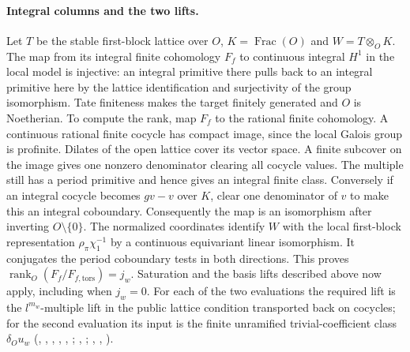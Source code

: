 \paragraph{Integral columns and the two lifts.}
Let $T$ be the stable first-block lattice over $O$, $K=\operatorname{Frac}(O)$
and $W=T\otimes_O K$. The map from its integral finite cohomology
$F_f$ to continuous integral $H^1$ in the local model is injective:
an integral primitive there pulls back to an integral primitive here
by the lattice identification and surjectivity of the group isomorphism.
Tate finiteness makes the target finitely generated and $O$ is
Noetherian. To compute the rank, map $F_f$ to the rational finite
cohomology. A continuous rational finite cocycle has compact image,
since the local Galois group is profinite. Dilates of the open lattice
cover its vector space. A finite subcover on the image gives one
nonzero denominator clearing all cocycle values. The multiple still
has a period primitive and hence gives an integral finite class.
Conversely if an integral cocycle becomes $g v-v$ over $K$, clear
one denominator of $v$ to make this an integral coboundary.
Consequently the map is an isomorphism after inverting $O\setminus\{0\}$.
The normalized coordinates identify $W$ with the local first-block
representation $\rho_\pi\chi_1^{-1}$ by a continuous equivariant
linear isomorphism. It conjugates the period coboundary tests in
both directions. This proves $\operatorname{rank}_O(F_f/F_{f,\mathrm{tors}})=j_w$.
Saturation and the basis lifts described above now apply, including
when $j_w=0$. For each of the two evaluations the required lift is
the $l^{m_w}$-multiple lift in the public lattice condition transported
back on cocycles; for the second evaluation its input is the finite
unramified trivial-coefficient class $\delta_O u_w$
(, , ,
, , ;
, ;
, , ).

